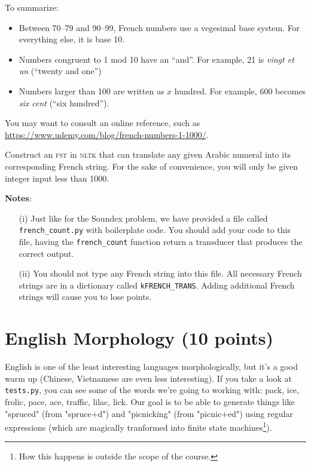 \documentclass[11pt]{article}
\begin{document}
\noindent To summarize:
\begin{itemize}
\item Between 70--79 and 90--99, French numbers use a
vegesimal base system.  For everything else, it is base 10.
\item Numbers congruent to 1 mod 10 have an ``and''.  For example, 21
  is \textit{vingt et un} (``twenty and one'')
\item Numbers larger than 100 are written as $x$ hundred.  For
  example, 600 becomes \textit{six cent} (``six hundred'').
\end{itemize}

You may want to consult an online reference, such as \url{https://www.udemy.com/blog/french-numbers-1-1000/}.

Construct an \textsc{fst} in \textsc{nltk} that can translate any
given Arabic numeral into its corresponding French string. For the
sake of convenience, you will only be given integer input less than
1000.


\noindent \textbf{Notes}:
\begin{itemize}
	\item[(i)]  Just like for the Soundex problem, we have provided a file
          called \texttt{french\_count.py} with boilerplate code. You
          should add your code to this file, having the
          \texttt{french\_count} function return a transducer that
          produces the correct output.
	\item[(ii)] You should not type any French string into this
          file.  All necessary French strings are in a dictionary
          called \texttt{kFRENCH\_TRANS}.  Adding additional French
          strings will cause you to lose points.
\end{itemize}

\section*{English Morphology (10 points)}

English is one of the least interesting languages morphologically, but
it's a good warm up (Chinese, Vietnamese are even less
interesting). If you take a look at \texttt{tests.py}, you can see
some of the words we're going to working with: pack, ice, frolic,
pace, ace, traffic, lilac, lick.  Our goal is to be able to generate
things like "spruced" (from "spruce+d") and "picnicking" (from
"picnic+ed") using regular expressions (which are magically tranformed
into finite state machines\footnote{How this happens is outside the
  scope of the course.}).
\end{document}
